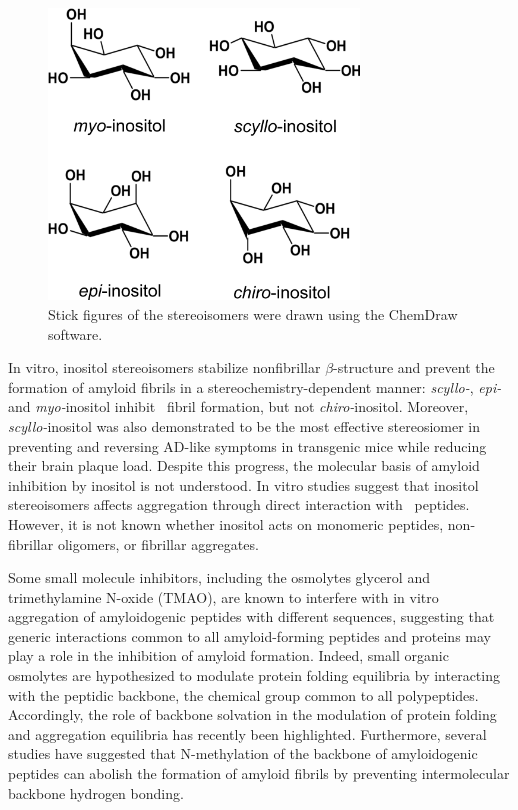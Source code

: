 \begin{figure}[htbp]
  \centering
  \includegraphics[width=3.25in]{figures/results1/GA4_paper_figures_submitted-1}
  \caption[Inositol stereoisomers most commonly found in nature.]
   {Stick figures of the stereoisomers were drawn using the ChemDraw software.}
   \label{fig:figure1}
\end{figure}

In vitro, inositol stereoisomers stabilize nonfibrillar $\beta$-structure and prevent the formation of amyloid fibrils in a stereochemistry-dependent manner: \textit{scyllo-}, \textit{epi-} and \textit{myo-}inositol inhibit \abeta\ fibril formation, but not \textit{chiro-}inositol.\cite{McLaurin:2000p64,McLaurin:1998p176,Nitz:2008p13,Sun:2008p12,Townsend:2006p44} Moreover, \textit{scyllo-}inositol was also demonstrated to be the most effective stereosiomer in preventing and reversing AD-like symptoms in transgenic mice while reducing their brain plaque load.\cite{McLaurin:2006p29} Despite this progress, the molecular basis of amyloid inhibition by inositol is not understood. In vitro studies suggest that inositol stereoisomers affects aggregation through direct interaction with \abeta\ peptides.\cite{McLaurin:1998p176,McLaurin:2000p64,Nitz:2008p13,Sun:2008p12} However, it is not known whether inositol acts on monomeric peptides, non-fibrillar oligomers, or fibrillar aggregates.

Some small molecule inhibitors, including the osmolytes glycerol and trimethylamine N-oxide (TMAO), are known to interfere with in vitro aggregation of amyloidogenic peptides with different sequences,\cite{Scaramozzino:2006p69,Yang:1999p77,McLaurin:2000p76,Ehrnhoefer:2008p8,Dasilva:2010p25,Bieschke:2010p32} suggesting that generic interactions common to all amyloid-forming peptides and proteins may play a role in the inhibition of amyloid formation. Indeed, small organic osmolytes are hypothesized to modulate protein folding equilibria by interacting with the peptidic backbone, the chemical group common to all polypeptides.\cite{Street:2006p21,Hu:2010p46,Auton:2008p28} Accordingly, the role of backbone solvation in the modulation of protein folding\cite{Rose:2006p35,Auton:2008p28} and aggregation equilibria has recently been highlighted.\cite{Rauscher:2006p43} Furthermore, several studies have suggested that N-methylation of the backbone of amyloidogenic peptides can abolish the formation of amyloid fibrils by preventing intermolecular backbone hydrogen bonding.\cite{Takeda:2010p52,Soto:2007p171}

